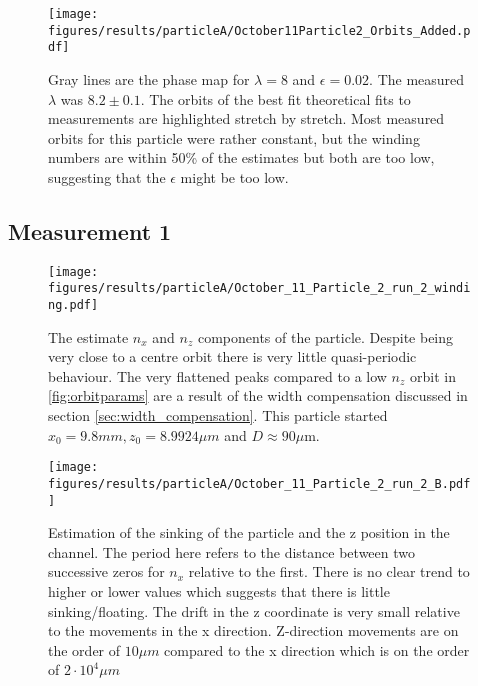 \begin{figure}[H]
\begin{center}
\texttt{[image: figures/results/particleA/October11Particle2\_Orbits\_Added.pdf]}
\end{center}
\caption{Gray lines are the phase map for $\lambda = 8$ and $\epsilon = 0.02$. The measured $\lambda$ was $8.2 \pm 0.1$. The orbits of the best fit theoretical fits to measurements are highlighted stretch by stretch. Most measured orbits for this particle were rather constant, but the winding numbers are within 50\% of the estimates but both are too low, suggesting that the $\epsilon$ might be too low.}
\label{fig:particleAOrbitFit}
\end{figure}


\subsection{Measurement 1}
\begin{figure}[H]
\begin{center}
\texttt{[image: figures/results/particleA/October\_11\_Particle\_2\_run\_2\_winding.pdf]}
\end{center}
\caption{The estimate $n_x$ and $n_z$ components of the particle. Despite being very close to a centre orbit there is very little quasi-periodic behaviour. The very flattened peaks compared to a low $n_z$ orbit in \ref{fig:orbitparams} are a result of the width compensation discussed in section \ref{sec:width_compensation}. This particle started $x_0 = 9.8 mm, z_0 = 8.9924 \mu m$ and $D \approx 90\mu$m.}
\label{fig:particleA1}
\end{figure}

\begin{figure}[H]
\begin{center}
\texttt{[image: figures/results/particleA/October\_11\_Particle\_2\_run\_2\_B.pdf]}
\end{center}
\caption{Estimation of the sinking of the particle and the z position in the channel. The period here refers to the distance between two successive zeros for $n_x$ relative to the first. There is no clear trend to higher or lower values which suggests that there is little sinking/floating. The drift in the z coordinate is very small relative to the movements in the x direction. Z-direction movements are on the order of $10\mu m$ compared to the x direction which is on the order of $2\cdot 10^4 \mu m$}
\label{fig:particleAsink}
\end{figure}

